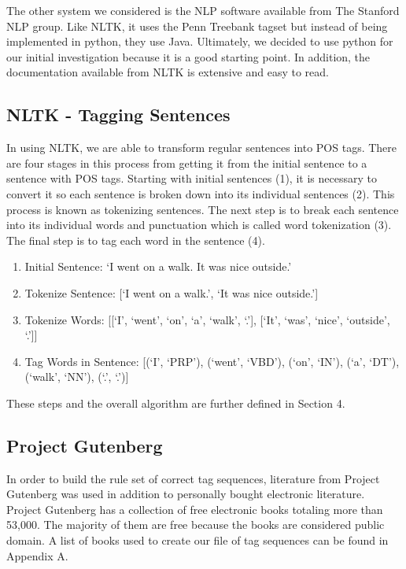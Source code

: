 \documentclass[11pt,a4paper]{article}
\begin{document}
\begin{multicols}{2}
The other system we considered is the NLP software available from The Stanford NLP group. Like NLTK, it uses the Penn Treebank tagset but instead of being implemented in python, they use Java. Ultimately, we decided to use python for our initial investigation because it is a good starting point. In addition, the documentation available from NLTK is extensive and easy to read.

\subsection{NLTK - Tagging Sentences}
In using NLTK, we are able to transform regular sentences into POS tags. There are four stages in this process from getting it from the initial sentence to a sentence with POS tags. Starting with initial sentences (1), it is necessary to convert it so each sentence is broken down into its individual sentences (2). This process is known as tokenizing sentences. The next step is to break each sentence into its individual words and punctuation which is called word tokenization (3). The final step is to tag each word in the sentence (4).

\begin{enumerate}
   \item Initial Sentence: `I went on a walk. It was nice outside.'
   \item Tokenize Sentence: [`I went on a walk.', `It was nice outside.']
   \item Tokenize Words: [[`I', `went', `on', `a', `walk', `.'], [`It', `was', `nice', `outside', `.']]
   \item Tag Words in Sentence: [(`I', `PRP'), (`went', `VBD'), (`on', `IN'), (`a', `DT'), (`walk', `NN'), (`.', `.')]
\end{enumerate}

These steps and the overall algorithm are further defined in Section 4.

\subsection{Project Gutenberg}
In order to build the rule set of correct tag sequences, literature from Project Gutenberg \cite{gutenberg} was used in addition to personally bought electronic literature. Project Gutenberg has a collection of free electronic books totaling more than 53,000. The majority of them are free because the books are considered public domain. A list of books used to create our file of tag sequences can be found in Appendix A. 


\end{multicols}
\end{document}
